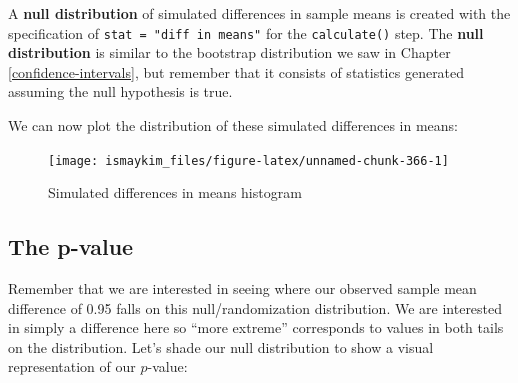 \documentclass[12pt, krantz2,]{krantz}
\makeatletter
\newenvironment{Shaded}{\begin{snugshade}}{\end{snugshade}}
\newcommand{\DataTypeTok}[1]{\textcolor[rgb]{0.27,0.27,0.27}{#1}}
\newcommand{\DecValTok}[1]{\textcolor[rgb]{0.06,0.06,0.06}{#1}}
\newcommand{\KeywordTok}[1]{\textcolor[rgb]{0.27,0.27,0.27}{\textbf{#1}}}
\newcommand{\NormalTok}[1]{#1}
\newcommand{\OperatorTok}[1]{\textcolor[rgb]{0.43,0.43,0.43}{\textbf{#1}}}
\newcommand{\StringTok}[1]{\textcolor[rgb]{0.5,0.5,0.5}{#1}}
\newenvironment{kframe}{%
\medskip{}
\setlength{\fboxsep}{.8em}
 \def\at@end@of@kframe{}%
 \ifinner\ifhmode%
  \def\at@end@of@kframe{\end{minipage}}%
  \begin{minipage}{\columnwidth}%
 \fi\fi%
 \def\FrameCommand##1{\hskip\@totalleftmargin \hskip-\fboxsep
 \colorbox{shadecolor}{##1}\hskip-\fboxsep
     \hskip-\linewidth \hskip-\@totalleftmargin \hskip\columnwidth}%
 \MakeFramed {\advance\hsize-\width
   \@totalleftmargin\z@ \linewidth\hsize
   \@setminipage}}%
 {\par\unskip\endMakeFramed%
 \at@end@of@kframe}
\renewenvironment{Shaded}{\begin{kframe}}{\end{kframe}}
\makeatother
\begin{document}
\begin{Shaded}
\end{Shaded}

A \textbf{null distribution} of simulated differences in sample means is created with the specification of \texttt{stat\ =\ "diff\ in\ means"} for the \texttt{calculate()} step. The \textbf{null distribution} is similar to the bootstrap distribution we saw in Chapter \ref{confidence-intervals}, but remember that it consists of statistics generated assuming the null hypothesis is true.

We can now plot the distribution of these simulated differences in means:

\begin{Shaded}
\end{Shaded}

\begin{figure}

{\centering \texttt{[image: ismaykim\_files/figure-latex/unnamed-chunk-366-1]} 

}

\caption{Simulated differences in means histogram}\label{fig:unnamed-chunk-366}
\end{figure}

\hypertarget{the-p-value}{%
\subsection{The p-value}\label{the-p-value}}

Remember that we are interested in seeing where our observed sample mean difference of 0.95 falls on this null/randomization distribution. We are interested in simply a difference here so ``more extreme'' corresponds to values in both tails on the distribution. Let's shade our null distribution to show a visual representation of our \(p\)-value:
\end{document}
